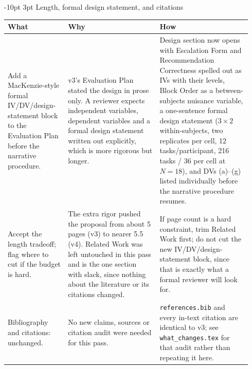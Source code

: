\documentclass[9pt,letterpaper]{extarticle}
\makeatletter
\newcommand{\rowsep}{\noalign{\vskip 1.5pt}\arrayrulecolor{black!35}\hline\arrayrulecolor{black}\noalign{\vskip 1.5pt}}
\renewcommand\section{\@startsection{section}{1}{\z@}%
  {-10pt \@plus -2pt \@minus -1pt}{3pt}%
  {\sffamily\bfseries\large\color{accent}}}
\let\oldsection\section
\renewcommand{\section}{\needspace{7\baselineskip}\oldsection}
\newcommand{\wwh}{\toprule
\sffamily\bfseries\color{accent} What & \sffamily\bfseries\color{accent} Why & \sffamily\bfseries\color{accent} How \\
\midrule}
\newenvironment{wwhtable}{\footnotesize
\begin{longtable}{@{}>{\raggedright\arraybackslash}p{0.23\linewidth}>{\raggedright\arraybackslash}p{0.355\linewidth}>{\raggedright\arraybackslash}p{0.355\linewidth}@{}}
\wwh}{\bottomrule\end{longtable}}
\makeatother
\begin{document}
\section{Length, formal design statement, and citations}
\begin{wwhtable}
Add a MacKenzie-style formal IV/DV/design-statement block to the
Evaluation Plan before the narrative procedure. &
v3's Evaluation Plan stated the design in prose only. A reviewer expects
independent variables, dependent variables and a formal design statement
written out explicitly, which is more rigorous but longer. &
Design section now opens with Escalation Form and Recommendation
Correctness spelled out as IVs with their levels, Block Order as a
between-subjects nuisance variable, a one-sentence formal design statement
($3\times2$ within-subjects, two replicates per cell, 12 tasks/participant,
216 tasks / 36 per cell at $N{=}18$), and DVs (a)--(g) listed individually
before the narrative procedure resumes. \\
\rowsep
Accept the length tradeoff; flag where to cut if the budget is hard. &
The extra rigor pushed the proposal from about 5 pages (v3) to nearer 5.5
(v4). Related Work was left untouched in this pass and is the one section
with slack, since nothing about the literature or its citations changed. &
If page count is a hard constraint, trim Related Work first; do not cut
the new IV/DV/design-statement block, since that is exactly what a formal
reviewer will look for. \\
\rowsep
Bibliography and citations: unchanged. &
No new claims, sources or citation audit were needed for this pass. &
\texttt{references.bib} and every in-text citation are identical to v3;
see \texttt{what\_changes.tex} for that audit rather than repeating it
here. \\
\end{wwhtable}
\end{document}
